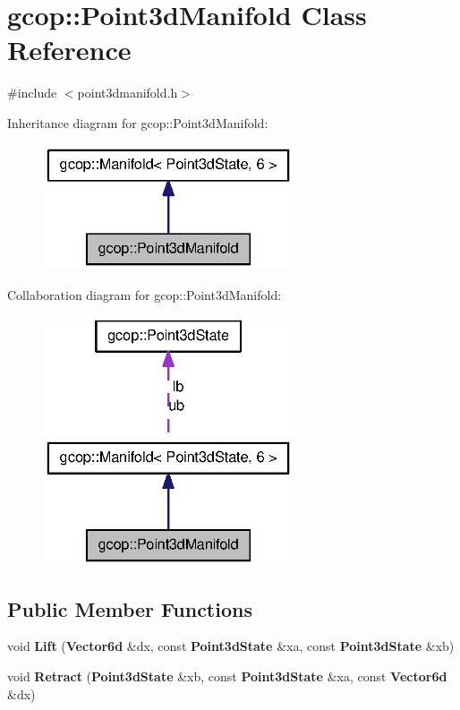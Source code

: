 \section{gcop\-:\-:\-Point3d\-Manifold \-Class \-Reference}
\label{classgcop_1_1Point3dManifold}


{\ttfamily \#include $<$point3dmanifold.\-h$>$}



\-Inheritance diagram for gcop\-:\-:\-Point3d\-Manifold\-:\nopagebreak
\begin{figure}[H]
\begin{center}
\leavevmode
\includegraphics[width=210pt]{classgcop_1_1Point3dManifold__inherit__graph}
\end{center}
\end{figure}


\-Collaboration diagram for gcop\-:\-:\-Point3d\-Manifold\-:\nopagebreak
\begin{figure}[H]
\begin{center}
\leavevmode
\includegraphics[width=210pt]{classgcop_1_1Point3dManifold__coll__graph}
\end{center}
\end{figure}
\subsection*{\-Public \-Member \-Functions}
\begin{DoxyCompactItemize}
\item 
void {\bf \-Lift} ({\bf \-Vector6d} \&dx, const {\bf \-Point3d\-State} \&xa, const {\bf \-Point3d\-State} \&xb)
\item 
void {\bf \-Retract} ({\bf \-Point3d\-State} \&xb, const {\bf \-Point3d\-State} \&xa, const {\bf \-Vector6d} \&dx)
\end{DoxyCompactItemize}
